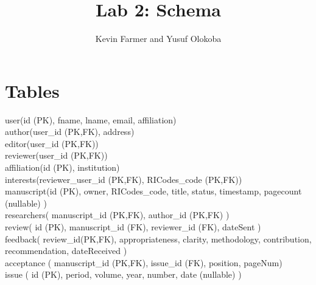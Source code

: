 \documentclass{article}
\title{Lab 2: Schema}
\author{Kevin Farmer and Yusuf Olokoba}
\begin{document}
\maketitle



\section*{Tables}

\medskip
user(id (PK), fname, lname, email, affiliation) \\

author(user\_id (PK,FK), address) \\

editor(user\_id (PK,FK)) \\

reviewer(user\_id (PK,FK)) \\

affiliation(id (PK), institution) \\

interests(reviewer\_user\_id (PK,FK), RICodes\_code (PK,FK)) \\

manuscript(id (PK), owner, RICodes\_code, title, status, timestamp, pagecount (nullable) ) \\

researchers( manuscript_id (PK,FK), author_id (PK,FK) ) \\

review( id (PK), manuscript\_id (FK), reviewer\_id (FK), dateSent ) \\

feedback( review\_id(PK,FK), appropriateness, clarity, methodology, contribution, recommendation, dateReceived ) \\

acceptance ( manuscript\_id (PK,FK), issue\_id (FK), position, pageNum) \\

issue ( id (PK), period, volume, year, number, date (nullable) ) \\
\end{document}
